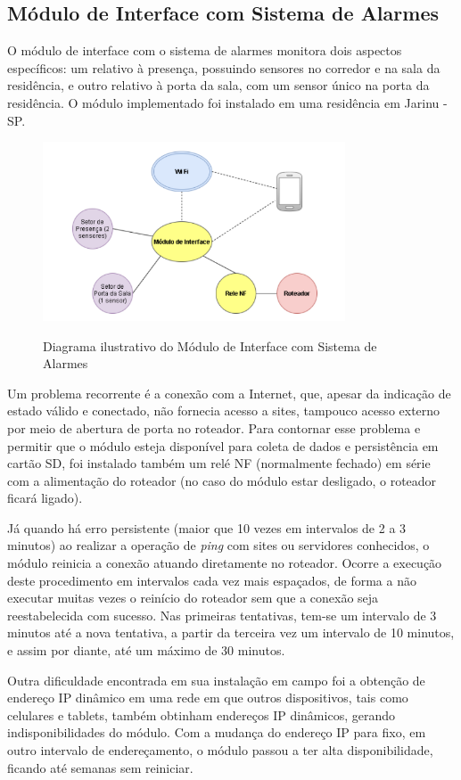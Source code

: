 \subsection{Módulo de Interface com Sistema de Alarmes}

O módulo de interface com o sistema de alarmes monitora dois aspectos específicos: um relativo à presença, possuindo sensores no corredor e na sala da residência, e outro relativo à porta da sala, com um sensor único na porta da residência. O módulo implementado foi instalado em uma residência em Jarinu - SP.

\begin{figure}[H]
	\centering
	\caption{Diagrama ilustrativo do Módulo de Interface com Sistema de Alarmes}
	\includegraphics[width=0.8\textwidth]{diagramaAlarme}
	\label{fig:diagramaAlarme}
\end{figure}

Um problema recorrente é a conexão com a Internet, que, apesar da indicação de estado válido e conectado, não fornecia acesso a sites, tampouco acesso externo por meio de abertura de porta no roteador. Para contornar esse problema e permitir que o módulo esteja disponível para coleta de dados e persistência em cartão SD, foi instalado também um relé NF (normalmente fechado) em série com a alimentação do roteador (no caso do módulo estar desligado, o roteador ficará ligado).

Já quando há erro persistente (maior que 10 vezes em intervalos de 2 a 3 minutos) ao realizar a operação de \emph{ping} com sites ou servidores conhecidos, o módulo reinicia a conexão atuando diretamente no roteador. Ocorre a execução deste procedimento em intervalos cada vez mais espaçados, de forma a não executar muitas vezes o reinício do roteador sem que a conexão seja reestabelecida com sucesso. Nas primeiras tentativas, tem-se um intervalo de 3 minutos até a nova tentativa, a partir da terceira vez um intervalo de 10 minutos, e assim por diante, até um máximo de 30 minutos.

Outra dificuldade encontrada em sua instalação em campo foi a obtenção de endereço IP dinâmico em uma rede em que outros dispositivos, tais como celulares e tablets, também obtinham endereços IP dinâmicos, gerando indisponibilidades do módulo. Com a mudança do endereço IP para fixo, em outro intervalo de endereçamento, o módulo passou a ter alta disponibilidade, ficando até semanas sem reiniciar.
